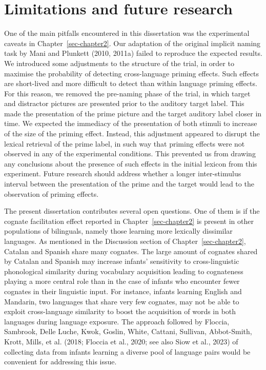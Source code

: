 \documentclass[
  12pt,
  b5paperpaper,
  twoside]{scrreprt}
\begin{document}
\hypertarget{limitations-and-future-research}{%
\section{Limitations and future
research}\label{limitations-and-future-research}}

One of the main pitfalls encountered in this dissertation was the
experimental caveats in Chapter~\ref{sec-chapter2}. Our adaptation of
the original implicit naming task by Mani and Plunkett (2010, 2011a)
failed to reproduce the expected results. We introduced some adjustments
to the structure of the trial, in order to maximise the probability of
detecting cross-language priming effects. Such effects are short-lived
and more difficult to detect than within language priming effects. For
this reason, we removed the pre-naming phase of the trial, in which
target and distractor pictures are presented prior to the auditory
target label. This made the presentation of the prime picture and the
target auditory label closer in time. We expected the immediacy of the
presentation of both stimuli to increase of the size of the priming
effect. Instead, this adjustment appeared to disrupt the lexical
retrieval of the prime label, in such way that priming effects were not
observed in any of the experimental conditions. This prevented us from
drawing any conclusions about the presence of such effects in the
initial lexicon from this experiment. Future research should address
whether a longer inter-stimulus interval between the presentation of the
prime and the target would lead to the observation of priming effects.

The present dissertation contributes several open questions. One of them
is if the cognate facilitation effect reported in
Chapter~\ref{sec-chapter2} is present in other populations of
bilinguals, namely those learning more lexically dissimilar languages.
As mentioned in the Discussion section of Chapter~\ref{sec-chapter2},
Catalan and Spanish share many cognates. The large amount of cognates
shared by Catalan and Spanish may increase infants' sensitivity to
cross-linguistic phonological similarity during vocabulary acquisition
leading to cognateness playing a more central role than in the case of
infants who encounter fewer cognates in their linguistic input. For
instance, infants learning English and Mandarin, two languages that
share very few cognates, may not be able to exploit cross-language
similarity to boost the acquisition of words in both languages during
language exposure. The approach followed by Floccia, Sambrook, Delle
Luche, Kwok, Goslin, White, Cattani, Sullivan, Abbot-Smith, Krott,
Mills, et al. (2018; Floccia et al., 2020; see also Siow et al., 2023)
of collecting data from infants learning a diverse pool of language
pairs would be convenient for addressing this issue.
\end{document}
